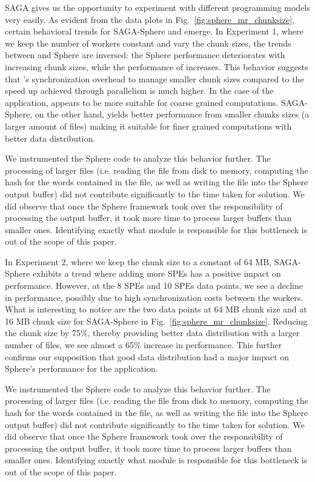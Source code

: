\documentclass[3p,twocolumn]{elsarticle}
\begin{document}
SAGA gives us the opportunity to experiment with different programming
models very easily.  As evident from the data plots in
Fig.~\ref{fig:sphere_mr_chunksize}, certain behavioral trends for
SAGA-Sphere and \sagamapreduce emerge.  In Experiment 1, where we keep
the number of workers constant and vary the chunk sizes, the trends
between \sagamapreduce and Sphere are inversed: the Sphere performance
deteriorates with increasing chunk sizes, while the performance of
\sagamapreduce increases. This behavior suggests that \sagamapreduce's
synchronization overhead to manage smaller chunk sizes compared to the
speed up achieved through parallelism is much higher.  In the case of
the \wc application, \sagamapreduce appears to be more suitable for
coarse grained computations. SAGA-Sphere, on the other hand, yields
better performance from smaller chunks sizes (a larger amount of
files) making it suitable for finer grained computations with better
data distribution.

We instrumented the Sphere code to analyze this behavior further.
The processing of larger files (i.e. reading the file from disk to memory,
computing the hash for the words contained in the file, as
well as writing the file into the Sphere output buffer) did not
contribute significantly to the time taken for solution. We did
observe that once the Sphere framework took over the responsibility
of processing the output buffer, it took more time to process larger
buffers than smaller ones. Identifying exactly what module is
responsible for this bottleneck is out of the scope of this paper.

In Experiment 2, where we keep the chunk size to a constant of 64 MB,
SAGA-Sphere exhibits a trend where adding more SPEs has a positive
impact on performance. However, at the 8 SPEs and 10 SPEs data points,
we see a decline in performance, possibly due to high synchronization
costs between the workers. What is interesting to notice are the two
data points at 64 MB chunk size and at 16 MB chunk size for
SAGA-Sphere in Fig.~\ref{fig:sphere_mr_chunksize}.  Reducing the chunk
size by 75\%, thereby providing better data distribution with a larger
number of files, we see almost a 65\% increase in performance. This
further confirms our supposition that good data distribution had a
major impact on Sphere's performance for the \wc application.

We instrumented the Sphere code to analyze this behavior further.
The processing of larger files (i.e. reading the file from disk to memory,
computing the hash for the words contained in the file, as
well as writing the file into the Sphere output buffer) did not
contribute significantly to the time taken for solution. We did
observe that once the Sphere framework took over the responsibility
of processing the output buffer, it took more time to process larger
buffers than smaller ones. Identifying exactly what module is
responsible for this bottleneck is out of the scope of this paper.
\end{document}
